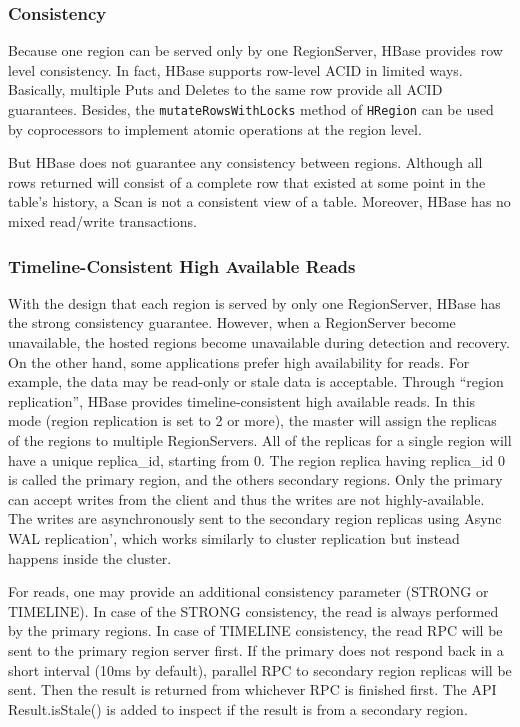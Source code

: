 \documentclass[11pt]{book}
\begin{document}
\subsubsection{Consistency}
Because one region can be served only by one RegionServer, HBase provides row level consistency. In fact, HBase supports row-level ACID in limited ways. Basically, multiple Puts and Deletes to the same row provide all ACID guarantees. Besides, the \texttt{mutateRowsWithLocks} method of \texttt{HRegion} can be used by coprocessors to implement atomic operations at the region level.

But HBase does not guarantee any consistency between regions. Although all rows returned will consist of a complete row that existed at some point in the table's history, a Scan is not a consistent view of a table. Moreover,  HBase has no mixed read/write transactions.

\subsubsection{Timeline-Consistent High Available Reads}
With the design that each region is served by only one RegionServer, HBase has the strong consistency guarantee. However, when a RegionServer become unavailable, the hosted regions become unavailable during detection and recovery. On the other hand, some applications prefer high availability for reads. For example, the data may be read-only or stale data is acceptable. Through ``region replication'', HBase provides timeline-consistent high available reads. In this mode (region replication is set to 2 or more), the master will assign the replicas of the regions to multiple RegionServers.  All of the replicas for a single region will have a unique replica\_id, starting from 0. The region replica having replica\_id 0 is called the primary region, and the others secondary regions. Only the primary can accept writes from the client and thus the writes are not highly-available. The writes are asynchronously sent to the secondary region replicas using Async WAL replication', which works similarly to cluster replication but instead happens inside the cluster.

For reads, one may provide an additional consistency parameter (STRONG or TIMELINE). In case of the STRONG consistency, the read is always performed by the primary regions. In case of TIMELINE consistency, the read RPC will be sent to the primary region server first. If the primary does not respond back in a short interval (10ms by default), parallel RPC to secondary region replicas will be sent. Then the result is returned from whichever RPC is finished first. The API Result.isStale() is added to inspect if the result is from a secondary region.
\end{document}
